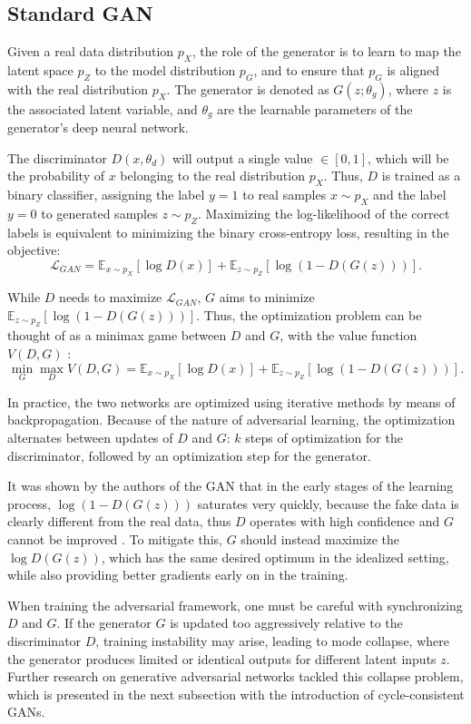 \subsection{Standard GAN}
\label{subsec:standard-gan}

Given a real data distribution $p_X$, the role of the generator is to learn to map the latent space $p_Z$ to the model distribution $p_G$, and to ensure that $p_G$ is aligned with the real distribution $p_X$. The generator is denoted as $G(z;\theta_g)$, where $z$ is the associated latent variable, and $\theta_g$ are the learnable parameters of the generator's deep neural network.

The discriminator $D(x, \theta_d)$ will output a single value $\in [0,1]$, which will be the probability of $x$ belonging to the real distribution $p_X$. Thus, $D$ is trained as a binary classifier, assigning the label $y = 1$ to real samples $x \sim p_X$ and the label $y = 0$ to generated samples $z \sim p_Z$. Maximizing the log-likelihood of the correct labels is equivalent to minimizing the binary cross-entropy loss, resulting in the objective:
$$
\mathcal{L}_{GAN} =\mathbb{E}_{x \sim p_X} [\log D(x)] + \mathbb{E}_{z \sim p_Z} [\log (1 - D(G(z)))].
$$

While $D$ needs to maximize $\mathcal{L}_{GAN}$, $G$ aims to minimize $\mathbb{E}_{z \sim p_Z}[\log(1 - D(G(z)))]$. Thus, the optimization problem can be thought of as a minimax game between $D$ and $G$, with the value function $V(D, G)$ \cite{goodfellow2014gan}:
$$
\min_G \max_DV(D,G) = \mathbb{E}_{x \sim p_X} [\log D(x)] + \mathbb{E}_{z \sim p_Z} [\log (1 - D(G(z)))].
$$

In practice, the two networks are optimized using iterative methods by means of backpropagation. Because of the nature of adversarial learning, the optimization alternates between updates of $D$ and $G$: $k$ steps of optimization for the discriminator, followed by an optimization step for the generator.

It was shown by the authors of the GAN  that in the early stages of the learning process, $\log (1-D(G(z)))$ saturates very quickly, because the fake data is clearly different from the real data, thus $D$ operates with high confidence and $G$ cannot be improved \cite{goodfellow2014gan}. To mitigate this, $G$ should instead maximize the $\log D(G(z))$, which has the same desired optimum in the idealized setting, while also providing better gradients early on in the training.

When training the adversarial framework, one must be careful with synchronizing $D$ and $G$. If the generator $G$ is updated too aggressively relative to the discriminator $D$, training instability may arise, leading to mode collapse, where the generator produces limited or identical outputs for different latent inputs $z$.
Further research on generative adversarial networks tackled this collapse problem, which is presented in the next subsection with the introduction of cycle-consistent GANs.

